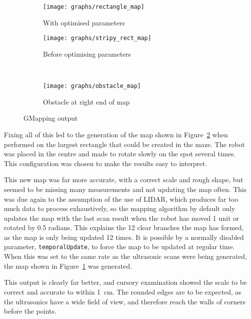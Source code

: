 \begin{figure}[!htb]
\centering
	\begin{subfigure}[b]{0.5\textwidth}
		\texttt{[image: graphs/rectangle\_map]}
		\caption{With optimised parameters}
		\label{fig:gmapping_output/rect}
	\end{subfigure}

  \centering
  \begin{subfigure}[b]{0.4\textwidth}
    \texttt{[image: graphs/stripy\_rect\_map]}
    \caption{Before optimising parameters}
    \label{fig:gmapping_output/stripy}
  \end{subfigure}
  ~
  \begin{subfigure}[b]{0.4\textwidth}
    \texttt{[image: graphs/obstacle\_map]}
    \caption{Obstacle at right end of map}
    \label{fig:gmapping_output/obstacle}
  \end{subfigure}
  \caption{GMapping output}\label{fig:gmapping_output}
\end{figure}

Fixing all of this led to the generation of the map shown in Figure~\ref{fig:gmapping_output/stripy} when performed
on the largest rectangle that could be created in the maze. The robot was placed in the centre and made to rotate
slowly on the spot several times. This configuration was chosen to make the results easy to interpret.



This new map was far more accurate, with a correct scale and rough shape, but seemed to be missing many measurements
and not updating the map often. This was due again to the assumption of the use of LIDAR, which produces far too
much data to process exhaustively, so the mapping algorithm by default only updates the map with the last scan result
when the robot has moved 1 unit or rotated by 0.5 radians. This explains the 12 clear branches the map has formed,
as the map is only being updated 12 times. It is possible by a normally disabled parameter, \verb|temporalUpdate|,
to force the map to be updated at regular time. When this was set to the same rate as the ultrasonic scans were
being generated, the map shown in Figure~\ref{fig:gmapping_output/rect} was generated.

This output is clearly far better, and cursory examination showed the scale to be correct and accurate to within
\SI{1}{cm}. The rounded edges are to be expected, as the ultrasonics have a wide field of view, and therefore
reach the walls of corners before the points.

